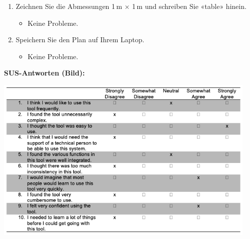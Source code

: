 \begin{enumerate}
\item Zeichnen Sie die Abmessungen 1\,m $\times$ 1\,m und schreiben Sie «table» hinein.
\begin{itemize}
    \item Keine Probleme.
\end{itemize}

\item Speichern Sie den Plan auf Ihrem Laptop.
\begin{itemize}
    \item Keine Probleme.
\end{itemize}
\end{enumerate}

\clearpage

\textbf{SUS-Antworten (Bild):}
\begin{center}
\includegraphics[width=0.95\textwidth]{graphics/sus_person3.png}
\end{center}

